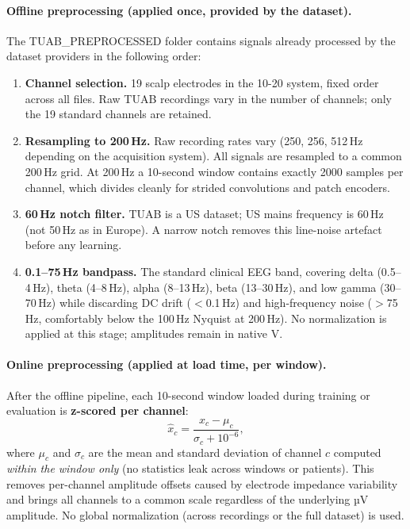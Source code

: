 \documentclass[11pt,a4paper]{article}
\begin{document}
\paragraph{Offline preprocessing (applied once, provided by the dataset).}
The TUAB\_PREPROCESSED folder contains signals already processed by the dataset
providers in the following order:
\begin{enumerate}[noitemsep]
  \item \textbf{Channel selection.}  19 scalp electrodes in the 10-20 system,
    fixed order across all files.  Raw TUAB recordings vary in the number of
    channels; only the 19 standard channels are retained.
  \item \textbf{Resampling to 200\,Hz.}  Raw recording rates vary (250, 256,
    512\,Hz depending on the acquisition system).  All signals are resampled to a
    common 200\,Hz grid.  At 200\,Hz a 10-second window contains exactly 2000
    samples per channel, which divides cleanly for strided convolutions and patch
    encoders.
  \item \textbf{60\,Hz notch filter.}  TUAB is a US dataset; US mains frequency
    is 60\,Hz (not 50\,Hz as in Europe).  A narrow notch removes this line-noise
    artefact before any learning.
  \item \textbf{0.1--75\,Hz bandpass.}  The standard clinical EEG band, covering
    delta (0.5--4\,Hz), theta (4--8\,Hz), alpha (8--13\,Hz), beta (13--30\,Hz),
    and low gamma (30--70\,Hz) while discarding DC drift ($<$0.1\,Hz) and
    high-frequency noise ($>$75\,Hz, comfortably below the 100\,Hz Nyquist at
    200\,Hz).  No normalization is applied at this stage; amplitudes remain in
    native \textmu{}V.
\end{enumerate}

\paragraph{Online preprocessing (applied at load time, per window).}
After the offline pipeline, each 10-second window loaded during training or
evaluation is \textbf{z-scored per channel}:
\[
  \hat{x}_c = \frac{x_c - \mu_c}{\sigma_c + 10^{-6}},
\]
where $\mu_c$ and $\sigma_c$ are the mean and standard deviation of channel $c$
computed \emph{within the window only} (no statistics leak across windows or
patients).  This removes per-channel amplitude offsets caused by electrode
impedance variability and brings all channels to a common scale regardless of the
underlying µV amplitude.  No global normalization (across recordings or the full
dataset) is used.
\end{document}
